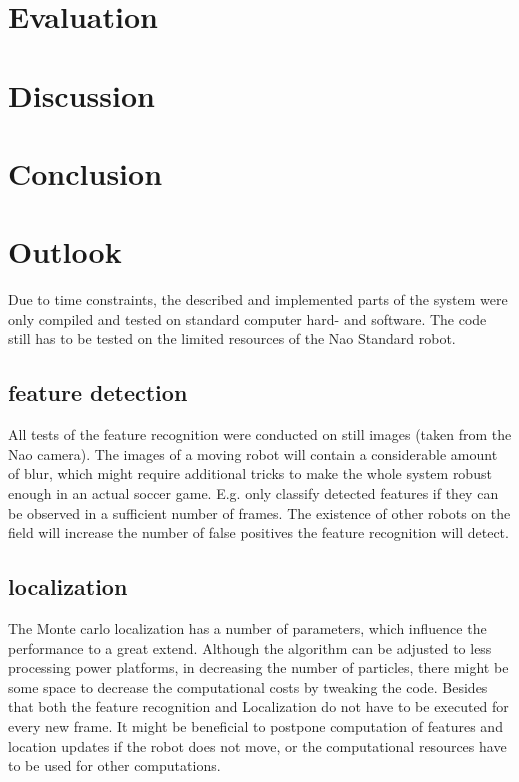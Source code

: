 \documentclass[	DIV=calc,%
							paper=a4,%
							fontsize=9pt,%
							twocolumn]{scrartcl}	 					%
\begin{document}
\section{Evaluation}
\label{sec:Evaluation}

\section{Discussion}
\label{sec:Discussion}

\section{Conclusion}
\label{sec:Conclusion}

\section{Outlook}
Due to time constraints, the described and implemented parts of the system were only compiled and tested on standard computer hard- and software. The code still has to be tested on the limited resources of the Nao Standard robot.
\subsection{feature detection}
All tests of the feature recognition were conducted on still images (taken from the Nao camera). The images of a moving robot will contain a considerable amount of blur, which might require additional tricks to make the whole system robust enough in an actual soccer game. E.g. only classify detected features if they can be observed in a sufficient number of frames.
The existence of other robots on the field will increase the number of false positives the feature recognition will detect.
\subsection{localization}
The Monte carlo localization has a number of parameters, which influence the performance to a great extend.
Although the algorithm can be adjusted to less processing power platforms, in decreasing the number of particles, there might be some space to decrease the computational costs by tweaking the code.
Besides that both the feature recognition and Localization do not have to be executed for every new frame. It might be beneficial to postpone computation of features and location updates if the robot does not move, or the computational resources have to be used for other computations.

\printbibliography
\end{document}
